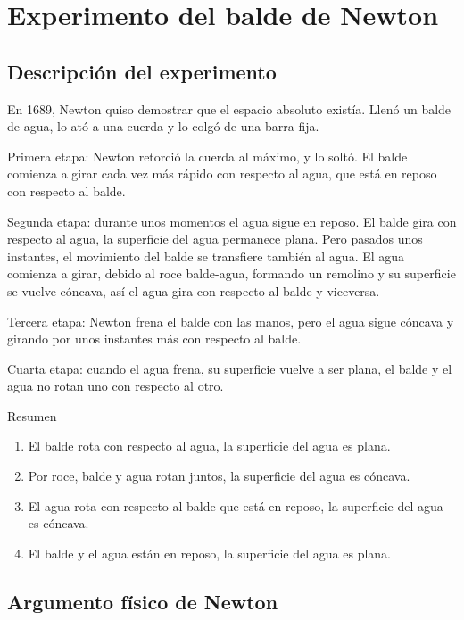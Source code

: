 \documentclass[../apunte_mecanica_clasica.tex]{subfiles}%
\begin{document}
\newpage
\section{Experimento del balde de Newton}

\subsection{Descripción del experimento}

En 1689, Newton quiso demostrar que el espacio absoluto existía. Llenó un balde de agua, lo ató a una cuerda y lo colgó de una barra fija.

Primera etapa: Newton retorció la cuerda al máximo, y lo soltó. El balde comienza a girar cada vez más rápido con respecto al agua, que está en reposo con respecto al balde.

Segunda etapa: durante unos momentos el agua sigue en reposo. El balde gira con respecto al agua, la superficie del agua permanece plana. Pero pasados unos instantes, el movimiento del balde se transfiere también al agua. El agua comienza a girar, debido al roce balde-agua, formando un remolino y su superficie se vuelve cóncava, así el agua gira con respecto al balde y viceversa.

Tercera etapa: Newton frena el balde con las manos, pero el agua sigue cóncava y girando por unos instantes más con respecto al balde.

Cuarta etapa: cuando el agua frena, su superficie vuelve a ser plana, el balde y el agua no rotan uno con respecto al otro.

\begin{apuntebloque}{Resumen}
\begin{enumerate}
    \item El balde rota con respecto al agua, la superficie del agua es plana.
    \item Por roce, balde y agua rotan juntos, la superficie del agua es cóncava.
    \item El agua rota con respecto al balde que está en reposo, la superficie del agua es cóncava.
    \item El balde y el agua están en reposo, la superficie del agua es plana.
\end{enumerate}
\end{apuntebloque}

\subsection{Argumento físico de Newton}
\end{document}
